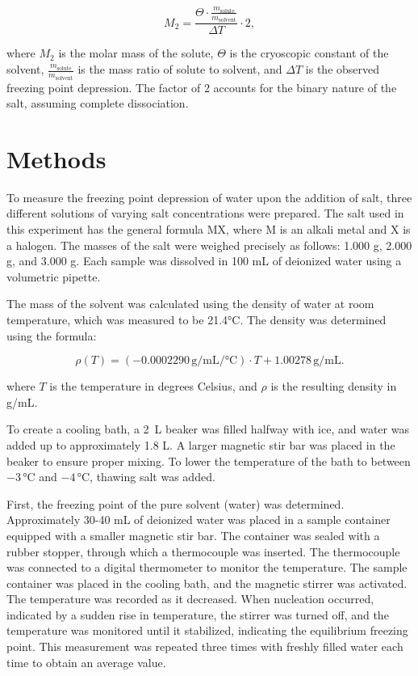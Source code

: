 \documentclass[a4paper,12pt]{article}
\begin{document}
\begin{equation}\label{eq:molar_mass_cryo}
M_2 = \frac{\Theta \cdot \frac{m_{\text{solute}}}{m_{\text{solvent}}}}{\Delta T} \cdot 2,
\end{equation}

where $M_2$ is the molar mass of the solute, $\Theta$ is the cryoscopic constant of the solvent, $\frac{m_{\text{solute}}}{m_{\text{solvent}}}$ is the mass ratio of solute to solvent, and $\Delta T$ is the observed freezing point depression. The factor of 2 accounts for the binary nature of the salt, assuming complete dissociation.

\section{Methods}
To measure the freezing point depression of water upon the addition of salt, three different solutions of varying salt concentrations were prepared. The salt used in this experiment has the general formula MX, where M is an alkali metal and X is a halogen. The masses of the salt were weighed precisely as follows: 1.000 g, 2.000 g, and 3.000 g. Each sample was dissolved in 100 mL of deionized water using a volumetric pipette.

The mass of the solvent was calculated using the density of water at room temperature, which was measured to be 21.4°C. The density was determined using the formula:

\begin{equation}\label{eq:water_density}
\rho(T) = (-0.0002290 \,\si{\gram\per\milli\liter\per\celsius}) \cdot T + 1.00278 \, \si{\gram\per\milli\liter}.
\end{equation}

where $T$ is the temperature in degrees Celsius, and $\rho$ is the resulting density in g/mL.

To create a cooling bath, a 2~L beaker was filled halfway with ice, and water was added up to approximately 1.8 L. A larger magnetic stir bar was placed in the beaker to ensure proper mixing. To lower the temperature of the bath to between $-3 \,\text{°C}$ and $-4 \,\text{°C}$, thawing salt was added.

First, the freezing point of the pure solvent (water) was determined. Approximately 30-40 mL of deionized water was placed in a sample container equipped with a smaller magnetic stir bar. The container was sealed with a rubber stopper, through which a thermocouple was inserted. The thermocouple was connected to a digital thermometer to monitor the temperature. The sample container was placed in the cooling bath, and the magnetic stirrer was activated. The temperature was recorded as it decreased. When nucleation occurred, indicated by a sudden rise in temperature, the stirrer was turned off, and the temperature was monitored until it stabilized, indicating the equilibrium freezing point. This measurement was repeated three times with freshly filled water each time to obtain an average value.
\end{document}

